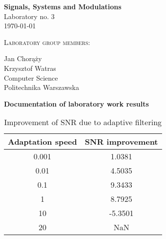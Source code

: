 \documentclass{article}
\begin{document}
\begin{titlepage}
   \begin{center}
       \vspace*{1cm}

       \textbf{\Huge Signals, Systems and Modulations} \\
        \vspace{2.0cm}
        \huge{Laboratory no. 3}
         \vspace{.7cm}
       \huge{\\ \today}

        \vspace{3.0cm}
        \textsc{Laboratory group members:}
        
        \vspace{0.4cm}
        Jan Chorąży\\
         \vspace{0.4cm}
        Krzysztof Watras\\

     
         
        \vspace{2 cm}   
       \small{Computer Science} \\  
       \vspace{0.2cm}       
       \small{Politechnika Warszawska} 
       \date{\today}
            
   \end{center}
\end{titlepage} 

\begin{center}
\textbf{\Large  Documentation of laboratory work results }\\ 
\end{center}

\begin{table}[ht!]
  \begin{center}
      \caption{Improvement of SNR due to adaptive filtering}
    \label{tab:task1tab}
    \begin{tabular}{c|c} 
      \textbf{Adaptation speed} & \textbf{SNR improvement} \\
      \hline
        0.001   & 1.0381 \\
        0.01    & 4.5035 \\
        0.1     & 9.3433 \\
        1       & 8.7925 \\
        10      & -5.3501 \\
        20      & NaN \\
    \end{tabular}
  \end{center}
\end{table}
\end{document}
